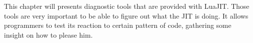 
This chapter will presents diagnostic tools that are provided with LuaJIT.
Those tools are very important to be able to figure out what the JIT is doing.
It allows programmers to test its reaction to certain pattern of code, gathering
some insight on how to please him.
